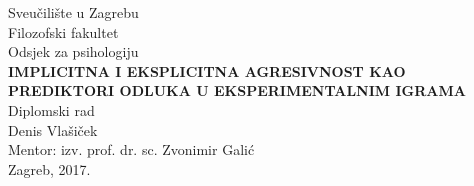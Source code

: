 \documentclass[a4paper, 12pt]{report}
\begin{document}
\begin{titlepage}
    \begin{center}
{Sveučilište u Zagrebu\\
    Filozofski fakultet\\
    Odsjek za psihologiju\\}
\vspace{9.5cm}
{\bfseries IMPLICITNA I EKSPLICITNA AGRESIVNOST KAO PREDIKTORI ODLUKA U
    EKSPERIMENTALNIM IGRAMA\\}
    Diplomski rad\\
\vspace{5cm}
Denis Vlašiček\\[0.7cm]
Mentor: izv. prof. dr. sc. Zvonimir Galić\\
\vspace{\fill}
Zagreb, 2017.
    \end{center}
\end{titlepage}

\setcounter{secnumdepth}{0} 
\tableofcontents
\thispagestyle{empty}
\end{document}

